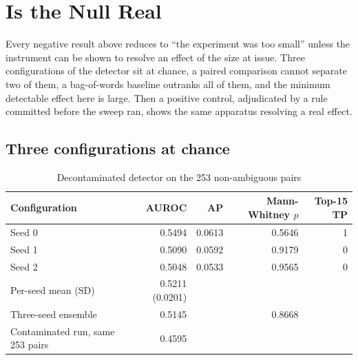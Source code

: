 \section{Is the Null Real}
\label{sec:res-rq4}

Every negative result above reduces to ``the experiment was too small'' unless
the instrument can be shown to resolve an effect of the size at issue. Three
configurations of the detector sit at chance, a paired comparison cannot separate
two of them, a bag-of-words baseline outranks all of them, and the minimum
detectable effect here is large. Then a positive control, adjudicated by a rule
committed before the sweep ran, shows the same apparatus resolving a real effect.

\subsection{Three configurations at chance}

\begin{table}[H]
\caption{Decontaminated detector on the 253 non-ambiguous pairs}
\centering
\small
\begin{tabular}{lrrrr}
\toprule
\textbf{Configuration} & \textbf{AUROC} & \textbf{AP} &
\textbf{Mann-Whitney $p$} & \textbf{Top-15 TP} \\
\midrule
Seed 0              & 0.5494 & 0.0613 & 0.5646 & 1 \\
Seed 1              & 0.5090 & 0.0592 & 0.9179 & 0 \\
Seed 2              & 0.5048 & 0.0533 & 0.9565 & 0 \\
Per-seed mean (SD)  & 0.5211 (0.0201) & & & \\
Three-seed ensemble & 0.5145 & & 0.8668 & \\
\midrule
Contaminated run, same 253 pairs & 0.4595 & & & \\
\bottomrule
\end{tabular}
\label{tab:decontam}
\end{table}

